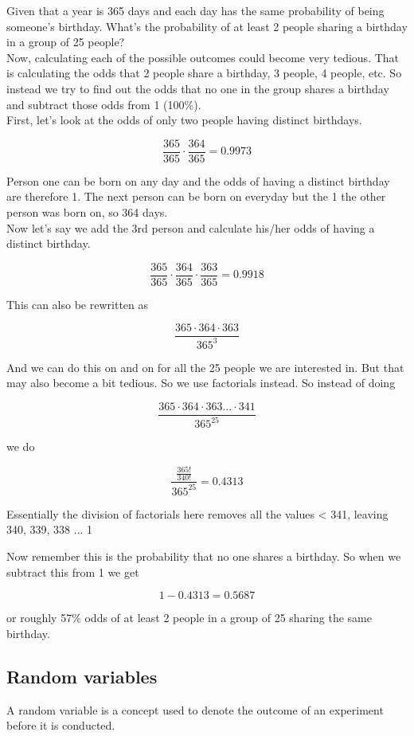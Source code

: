 \documentclass[12pt,a4paper]{article}
\theoremstyle{regla}
\theoremstyle{remark}
\theoremstyle{definition}
\theoremstyle{nonumberbreak}
\begin{document}
\begin{xmpl}
Given that a year is 365 days and each day has the same probability of being someone's birthday. 
What's the probability of at least 2 people sharing a birthday in a group of 25 people? \\

Now, calculating each of the possible outcomes could become very tedious. That is calculating the odds that 2 people share a birthday, 3 people, 4 people, etc. So instead we try to find out the odds that no one in the group shares a birthday and subtract those odds from 1 (100\%). \\

First, let's look at the odds of only two people having distinct birthdays. 

$$\frac{365}{365}\cdot\frac{364}{365} = 0.9973$$

Person one can be born on any day and the odds of having a distinct birthday are therefore 1. The next person can be born on everyday but the 1 the other person was born on, so 364 days.\\ 

Now let's say we add the 3rd person and calculate his/her odds of having a distinct birthday. 

$$\frac{365}{365}\cdot\frac{364}{365}\cdot\frac{363}{365} = 0.9918$$

This can also be rewritten as

$$\frac{365\cdot364\cdot363}{365^3}$$

And we can do this on and on for all the 25 people we are interested in. But that may also become a bit tedious. So we use factorials instead. So instead of doing

$$\frac{365\cdot364\cdot363...\cdot341}{365^{25}}$$

we do

$$\frac{\frac{365!}{340!}}{365^{25}}=0.4313$$

Essentially the division of factorials here removes all the values < 341, leaving 340, 339, 338 ... 1

Now remember this is the probability that no one shares a birthday. So when we subtract this from 1 we get

$$1-0.4313=0.5687$$

or roughly 57\% odds of at least 2 people in a group of 25 sharing the same birthday.
\end{xmpl}


\subsection{Random variables}
\begin{fbox}
\begin{minipage}{0.97\textwidth}
A random variable is a concept used to denote the outcome of an experiment before it is conducted.



\end{minipage}
\end{fbox}
\end{document}
